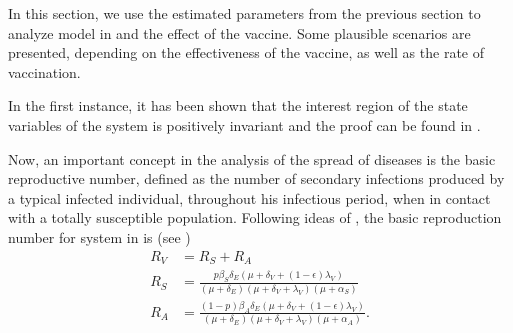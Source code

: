 In this section, we use the estimated parameters from the previous section
to analyze model in  and the effect of the vaccine. Some
plausible scenarios are presented, depending on the effectiveness of the
vaccine,  as well as the rate of vaccination.

In the first instance, it has been shown that the interest region of the
state variables of the system is positively invariant and the proof can be
found in .

Now, an important concept in the analysis of the spread of diseases is the
basic reproductive number, defined as the number of secondary infections
produced by a typical infected individual, throughout his infectious period,
when in contact with a totally susceptible population. Following ideas of
\cite{Van2002}, the basic reproduction number for system in  is (see
)
\begin{equation}\label{Rv}
    \begin{aligned}
        R_{V} &=
            R_S + R_A
        \\
        R_S &=
            \frac{
                p \beta_S \delta_E
                (\mu + \delta_V + (1 - \epsilon)
                \lambda_V)
            }{
                (\mu + \delta_E)
                (\mu + \delta_V + \lambda_V)
                (\mu + \alpha_S)
            }
            \\
        R_A &=
            \frac{
                (1-p) \beta_A \delta_E
                (\mu + \delta_V + (1-\epsilon) \lambda_V)
            }{
                (\mu + \delta_E)
                (\mu + \delta_V + \lambda_V)
                (\mu + \alpha_A )
            }.
    \end{aligned}
\end{equation}

